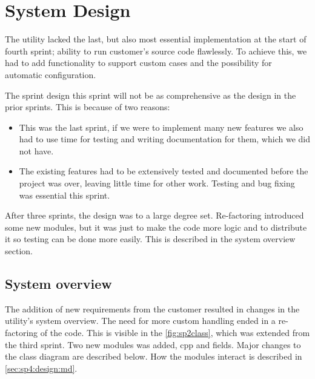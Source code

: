 \section{System Design}
\label{sec:sp4:design}
The utility lacked the last, but also most essential implementation at the start of fourth sprint; ability to run customer's source code flawlessly. To achieve this, we had to add functionality to support custom cases and the possibility for automatic configuration.

The sprint design this sprint will not be as comprehensive as the design in the prior sprints. This is because of two reasons:
\begin{itemize}
	\item This was the last sprint, if we were to implement many new features we also had to use time for testing and writing documentation for them, which we did not have.
	\item The existing features had to be extensively tested and documented before the project was over, leaving little time for other work. Testing and bug fixing was essential this sprint.
\end{itemize}
After three sprints, the design was to a large degree set. Re-factoring introduced some new modules, but it was just to make the code more logic and to distribute it so testing can be done more easily. This is described in the system overview section.

\subsection{System overview}
The addition of new requirements from the customer resulted in changes in the utility's system overview. The need for more custom handling ended in a re-factoring of the code. This is visible in the \autoref{fig:sp2class}, which was extended from the third sprint. Two new modules was added, cpp and fields. Major changes to the class diagram are described below. How the modules interact is described in \autoref{sec:sp4:design:md}.

